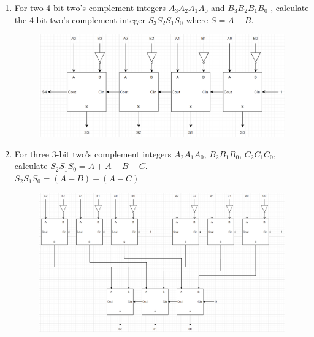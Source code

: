 \documentclass{article}
\begin{document}
\begin{enumerate}[label=\alph*.]
    \item For two 4-bit two's complement integers $A_3A_2A_1A_0$ and $B_3B_2B_1B_0$ , calculate the 4-bit two's complement integer $S_3S_2S_1S_0$ where $S=A-B$. \\
    \begin{figure}[!h]
        \centering
        \includegraphics[width=1\textwidth]{figures/adder2b_solution.png}
    \end{figure}
    \newpage
    \item For three 3-bit two's complement integers $A_2A_1A_0$, $B_2B_1B_0$, $C_2C_1C_0$, calculate $S_2S_1S_0=A+A-B-C$. \\
    $S_2S_1S_0 = (A-B)+(A-C)$\\
    \begin{figure}[!h]
        \centering
        \includegraphics[width=1\textwidth]{figures/adder2c_solution.png}
    \end{figure}
\end{enumerate}

\newpage
\end{document}
